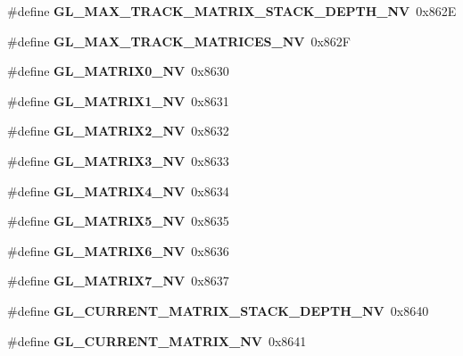 \begin{DoxyCompactItemize}
\item 
\#define {\bfseries G\+L\+\_\+\+M\+A\+X\+\_\+\+T\+R\+A\+C\+K\+\_\+\+M\+A\+T\+R\+I\+X\+\_\+\+S\+T\+A\+C\+K\+\_\+\+D\+E\+P\+T\+H\+\_\+\+N\+V}~0x862\+E\label{_s_d_l__opengl_8h_aaa1bd0166d1045c9c35c4826a03e306b}

\item 
\#define {\bfseries G\+L\+\_\+\+M\+A\+X\+\_\+\+T\+R\+A\+C\+K\+\_\+\+M\+A\+T\+R\+I\+C\+E\+S\+\_\+\+N\+V}~0x862\+F\label{_s_d_l__opengl_8h_ac14bd9b6d090c347da79bc56ad868fae}

\item 
\#define {\bfseries G\+L\+\_\+\+M\+A\+T\+R\+I\+X0\+\_\+\+N\+V}~0x8630\label{_s_d_l__opengl_8h_ab15e7ff788b496109136f3d10ae7ff18}

\item 
\#define {\bfseries G\+L\+\_\+\+M\+A\+T\+R\+I\+X1\+\_\+\+N\+V}~0x8631\label{_s_d_l__opengl_8h_a8ebe45a1754be4f1f4ea4fe3ea556736}

\item 
\#define {\bfseries G\+L\+\_\+\+M\+A\+T\+R\+I\+X2\+\_\+\+N\+V}~0x8632\label{_s_d_l__opengl_8h_ab8f1d3faa5a8b0b6e8b53e1a2c5affe6}

\item 
\#define {\bfseries G\+L\+\_\+\+M\+A\+T\+R\+I\+X3\+\_\+\+N\+V}~0x8633\label{_s_d_l__opengl_8h_a1d9c44d10393450b4ec2f3efef7a6b56}

\item 
\#define {\bfseries G\+L\+\_\+\+M\+A\+T\+R\+I\+X4\+\_\+\+N\+V}~0x8634\label{_s_d_l__opengl_8h_ad5543d563cc5fe4290f252eba28177c4}

\item 
\#define {\bfseries G\+L\+\_\+\+M\+A\+T\+R\+I\+X5\+\_\+\+N\+V}~0x8635\label{_s_d_l__opengl_8h_a894ebe705df187ee6d3be4d5cdf9f954}

\item 
\#define {\bfseries G\+L\+\_\+\+M\+A\+T\+R\+I\+X6\+\_\+\+N\+V}~0x8636\label{_s_d_l__opengl_8h_af51dfb760407db116f98c5f6710f535f}

\item 
\#define {\bfseries G\+L\+\_\+\+M\+A\+T\+R\+I\+X7\+\_\+\+N\+V}~0x8637\label{_s_d_l__opengl_8h_a9b1f62838126bd3206a9aa764cd8ed67}

\item 
\#define {\bfseries G\+L\+\_\+\+C\+U\+R\+R\+E\+N\+T\+\_\+\+M\+A\+T\+R\+I\+X\+\_\+\+S\+T\+A\+C\+K\+\_\+\+D\+E\+P\+T\+H\+\_\+\+N\+V}~0x8640\label{_s_d_l__opengl_8h_a69a844878a8cd9b0fb5dceb3b1a2df22}

\item 
\#define {\bfseries G\+L\+\_\+\+C\+U\+R\+R\+E\+N\+T\+\_\+\+M\+A\+T\+R\+I\+X\+\_\+\+N\+V}~0x8641\label{_s_d_l__opengl_8h_a8562500ab7885a0efba03e3e8d02722d}


\end{DoxyCompactItemize}
